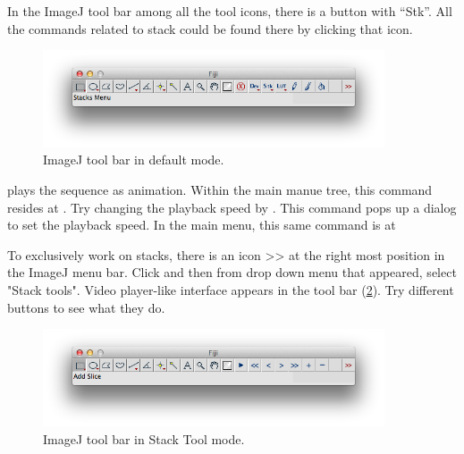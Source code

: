 \begin{indentexercise}{2}

In the ImageJ tool bar among all the tool icons, there is a button with ``Stk''. All the commands related to stack could be found there by clicking that icon. 

\begin{figure}[htbp]
\begin{center}
\includegraphics[width=0.9\textwidth]{fig/fijiMenu.png}
\caption{ ImageJ tool bar in default mode.}
\label{fig:img130}
\end{center}
\end{figure}

 plays the sequence as animation. Within the main manue tree, this command resides at . 
Try changing the playback speed by . This command pops up a dialog to set the playback speed. In the main menu, this same command is at  

To exclusively work on stacks, there is an icon >> at the right most position in the ImageJ menu bar. Click and then from drop down menu that appeared, select "Stack tools". Video player-like interface appears in the tool bar (\ref{fig:img130}). Try different buttons to see what they do. 

\begin{figure}[htbp]
\begin{center}
\includegraphics[width=0.9\textwidth]{fig/fijiMenu_StackMode.png}
\caption{ ImageJ tool bar in Stack Tool mode.}
\label{fig:img130}
\end{center}
\end{figure}


\end{indentexercise}
